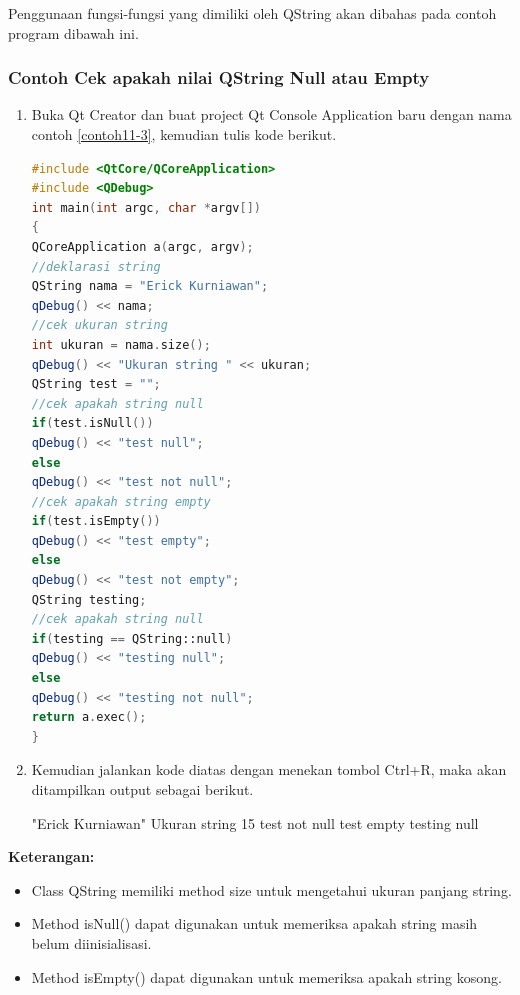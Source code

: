 Penggunaan fungsi-fungsi yang dimiliki oleh QString akan dibahas pada
contoh program dibawah ini.

\subsubsection*{Contoh  Cek apakah nilai QString Null atau Empty}

\begin{enumerate}

\item
  Buka Qt Creator dan buat project Qt Console Application baru dengan
  nama contoh \ref{contoh11-3}, kemudian tulis kode berikut.

\begin{lstlisting}[language=c++, caption= Cek apakah nilai QString Null atau Empty, label=contoh11-3]
#include <QtCore/QCoreApplication>
#include <QDebug>
int main(int argc, char *argv[])
{
QCoreApplication a(argc, argv);
//deklarasi string
QString nama = "Erick Kurniawan";
qDebug() << nama;
//cek ukuran string
int ukuran = nama.size();
qDebug() << "Ukuran string " << ukuran;
QString test = "";
//cek apakah string null
if(test.isNull())
qDebug() << "test null";
else
qDebug() << "test not null";
//cek apakah string empty
if(test.isEmpty())
qDebug() << "test empty";
else
qDebug() << "test not empty";
QString testing;
//cek apakah string null
if(testing == QString::null)
qDebug() << "testing null";
else
qDebug() << "testing not null";
return a.exec();
}
\end{lstlisting}
\item
  Kemudian jalankan kode diatas dengan menekan tombol Ctrl+R, maka akan
  ditampilkan output sebagai berikut.

  \begin{lcverbatim}
"Erick Kurniawan"
Ukuran string  15
test not null
test empty
testing null
  \end{lcverbatim}
\end{enumerate}

\textbf{Keterangan:}

\begin{itemize}

\item
  Class QString memiliki method size untuk mengetahui ukuran panjang
  string.
\item
  Method isNull() dapat digunakan untuk memeriksa apakah string masih
  belum diinisialisasi.
\item
  Method isEmpty() dapat digunakan untuk memeriksa apakah string kosong.
\end{itemize}

